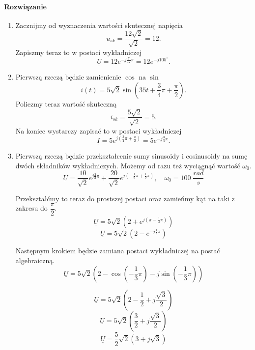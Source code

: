\documentclass[12pt, a4paper]{article}
\begin{document}
\paragraph{Rozwiązanie}
\begin{enumerate}[label=\alph*)]
  \item Zacznijmy od wyznaczenia wartości skutecznej napięcia
        $$
          u_{sk} = \frac{12\sqrt{2}}{\sqrt{2}} = 12.
        $$
        Zapiszmy teraz to w postaci wykładniczej
        $$
          \underline{U} = 12e^{-j\frac{7}{12}\pi} = 12e^{-j105^\circ}.
        $$
  \item Pierwszą rzeczą będzie zamienienie $\cos$ na $\sin$
        $$
          i(t) = 5\sqrt{2}\sin\left(35t+\frac{3}{4}\pi+\frac{\pi}{2}\right).
        $$
        Policzmy teraz wartość skuteczną
        $$
          i_{sk} = \frac{5\sqrt{2}}{\sqrt{2}} = 5.
        $$
        Na koniec wystarczy zapisać to w postaci wykładniczej
        $$
          \underline{I} = 5e^{j\left(\frac{3}{4}\pi+\frac{\pi}{2}\right)} =
          5e^{-j\frac{3}{4}\pi}.
        $$
  \item Pierwszą rzeczą będzie przekształcenie sumy sinusoidy i cosinusoidy na
        sumę dwóch składników wykładniczych. Możemy od razu też wyciągnąć wartość
        $\omega_0$.
        $$
          \underline{U} = \dfrac{10}{\sqrt{2}}e^{j\frac{2}{3}\pi} +
          \dfrac{20}{\sqrt{2}}e^{j\left(-\frac{1}{2}\pi+\frac{1}{2}\pi\right)}, \quad
          \omega_0 = 100\; \frac{rad}{s}
        $$

        Przekształćmy to teraz do prostszej postaci oraz zamieńmy kąt na taki z
        zakresu do $\dfrac{\pi}{2}$.
        $$
          \underline{U} = 5\sqrt{2}\left(2+e^{j\left(\pi-\frac{1}{3}\pi\right)}\right)
        $$
        $$
          \underline{U} = 5\sqrt{2}\left(2-e^{-j\frac{1}{3}\pi}\right)
        $$

        Następnym krokiem będzie zamiana postaci wykładniczej na postać
        algebraiczną.
        $$
          \underline{U} = 5\sqrt{2}\left(2-\cos\left(-\dfrac{1}{3}\pi\right)
          -j\sin\left(-\dfrac{1}{3}\pi\right)\right)
        $$

        $$
          \underline{U} = 5\sqrt{2}\left(2-\dfrac{1}{2}+j\dfrac{\sqrt{3}}{2}\right)
        $$
        $$
          \underline{U} = 5\sqrt{2}\left(\dfrac{3}{2}+j\dfrac{\sqrt{3}}{2}\right)
        $$
        \begin{equation}\label{2.1c_algebraiczna}
          \underline{U} = \dfrac{5}{2}\sqrt{2}\left(3+j\sqrt{3}\right)
        \end{equation}


\end{enumerate}
\end{document}
